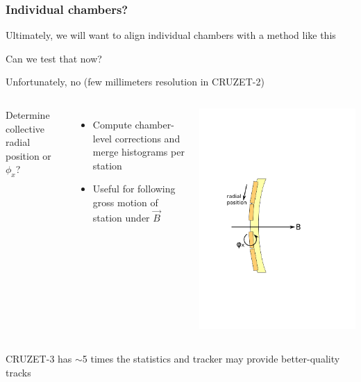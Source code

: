 \documentclass[compress]{beamer}
\begin{document}
\begin{frame}
\frametitle{Individual chambers?}

Ultimately, we will want to align individual chambers with a method like this

\vfill
Can we test that now?

Unfortunately, no (few millimeters resolution in CRUZET-2)

\vspace{-2 cm}
\begin{columns}
Determine collective radial position or $\phi_x$?

\begin{itemize}
\item Compute chamber-level corrections and merge histograms per station
\item Useful for following gross motion of station under $\vec{B}$
\end{itemize}

\includegraphics[width=1.2\linewidth]{turn_on_magnet.png}
\end{columns}

\vspace{-1.2 cm}
CRUZET-3 has $\sim$5 times the statistics and tracker may provide better-quality tracks
\end{frame}
\end{document}
